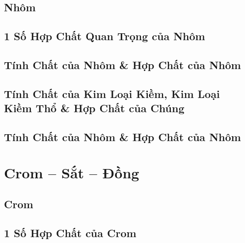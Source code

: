 \documentclass{article}
\numberwithin{equation}{section}
\begin{document}
\subsection{Nhôm}


\subsection{1 Số Hợp Chất Quan Trọng của Nhôm}


\subsection{Tính Chất của Nhôm \& Hợp Chất của Nhôm}


\subsection{Tính Chất của Kim Loại Kiềm, Kim Loại Kiềm Thổ \& Hợp Chất của Chúng}


\subsection{Tính Chất của Nhôm \& Hợp Chất của Nhôm}


\section{Crom -- Sắt -- Đồng}

\subsection{Crom}


\subsection{1 Số Hợp Chất của Crom}
\end{document}
